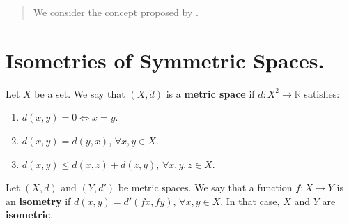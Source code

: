 \documentclass{amsart}
\begin{document}
\begin{abstract}
	We consider the concept proposed by \cite{feng}.
\end{abstract}
\maketitle

\section{Isometries of Symmetric Spaces.} %
\begin{definition}
	Let \(X\) be a set. We say that \((X,d)\) is a \textbf{metric space} if \(d:X^2 \longrightarrow \mathbb{R}\) satisfies:
	\begin{enumerate}
		\item \(d(x,y) =0 \iff x = y\).
		\item \(d(x,y) = d(y,x)\), \(\forall x,y \in X\).
		\item \(d(x,y) \leqslant d(x,z) + d(z,y)\), \(\forall x,y,z \in X\).
	\end{enumerate}
\end{definition}
\begin{definition}
	Let \((X,d)\) and \((Y,d')\) be metric spaces.
	We say that a function \(f:X \longrightarrow Y\) is an \textbf{isometry} if \(d(x,y) = d' (fx,fy)\), \(\forall x,y \in X\).
	In that case, \(X\) and \(Y\) are \textbf{isometric}.
\end{definition}
\end{document}
